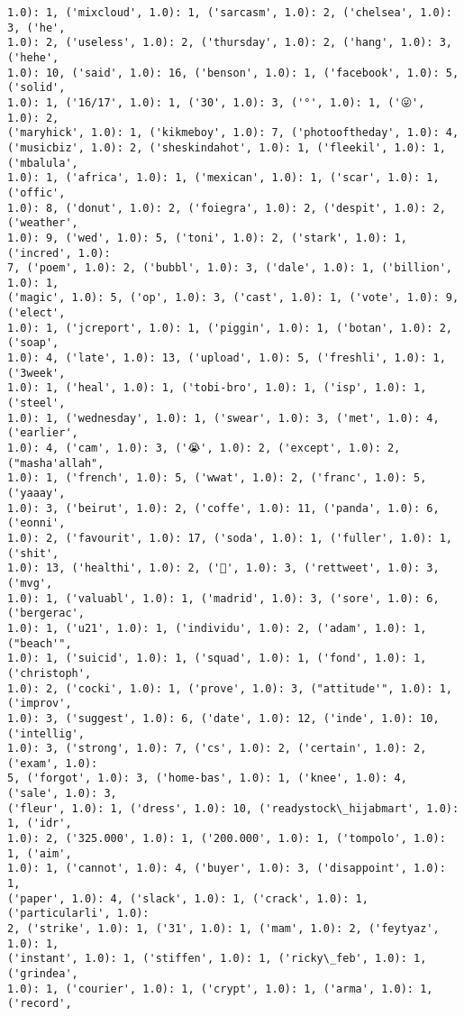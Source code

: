 \documentclass[11pt]{article}
\begin{document}
\begin{Verbatim}[commandchars=\\\{\}]
1.0): 1, ('mixcloud', 1.0): 1, ('sarcasm', 1.0): 2, ('chelsea', 1.0): 3, ('he',
1.0): 2, ('useless', 1.0): 2, ('thursday', 1.0): 2, ('hang', 1.0): 3, ('hehe',
1.0): 10, ('said', 1.0): 16, ('benson', 1.0): 1, ('facebook', 1.0): 5, ('solid',
1.0): 1, ('16/17', 1.0): 1, ('30', 1.0): 3, ('°', 1.0): 1, ('😜', 1.0): 2,
('maryhick', 1.0): 1, ('kikmeboy', 1.0): 7, ('photooftheday', 1.0): 4,
('musicbiz', 1.0): 2, ('sheskindahot', 1.0): 1, ('fleekil', 1.0): 1, ('mbalula',
1.0): 1, ('africa', 1.0): 1, ('mexican', 1.0): 1, ('scar', 1.0): 1, ('offic',
1.0): 8, ('donut', 1.0): 2, ('foiegra', 1.0): 2, ('despit', 1.0): 2, ('weather',
1.0): 9, ('wed', 1.0): 5, ('toni', 1.0): 2, ('stark', 1.0): 1, ('incred', 1.0):
7, ('poem', 1.0): 2, ('bubbl', 1.0): 3, ('dale', 1.0): 1, ('billion', 1.0): 1,
('magic', 1.0): 5, ('op', 1.0): 3, ('cast', 1.0): 1, ('vote', 1.0): 9, ('elect',
1.0): 1, ('jcreport', 1.0): 1, ('piggin', 1.0): 1, ('botan', 1.0): 2, ('soap',
1.0): 4, ('late', 1.0): 13, ('upload', 1.0): 5, ('freshli', 1.0): 1, ('3week',
1.0): 1, ('heal', 1.0): 1, ('tobi-bro', 1.0): 1, ('isp', 1.0): 1, ('steel',
1.0): 1, ('wednesday', 1.0): 1, ('swear', 1.0): 3, ('met', 1.0): 4, ('earlier',
1.0): 4, ('cam', 1.0): 3, ('😭', 1.0): 2, ('except', 1.0): 2, ("masha'allah",
1.0): 1, ('french', 1.0): 5, ('wwat', 1.0): 2, ('franc', 1.0): 5, ('yaaay',
1.0): 3, ('beirut', 1.0): 2, ('coffe', 1.0): 11, ('panda', 1.0): 6, ('eonni',
1.0): 2, ('favourit', 1.0): 17, ('soda', 1.0): 1, ('fuller', 1.0): 1, ('shit',
1.0): 13, ('healthi', 1.0): 2, ('💓', 1.0): 3, ('rettweet', 1.0): 3, ('mvg',
1.0): 1, ('valuabl', 1.0): 1, ('madrid', 1.0): 3, ('sore', 1.0): 6, ('bergerac',
1.0): 1, ('u21', 1.0): 1, ('individu', 1.0): 2, ('adam', 1.0): 1, ("beach'",
1.0): 1, ('suicid', 1.0): 1, ('squad', 1.0): 1, ('fond', 1.0): 1, ('christoph',
1.0): 2, ('cocki', 1.0): 1, ('prove', 1.0): 3, ("attitude'", 1.0): 1, ('improv',
1.0): 3, ('suggest', 1.0): 6, ('date', 1.0): 12, ('inde', 1.0): 10, ('intellig',
1.0): 3, ('strong', 1.0): 7, ('cs', 1.0): 2, ('certain', 1.0): 2, ('exam', 1.0):
5, ('forgot', 1.0): 3, ('home-bas', 1.0): 1, ('knee', 1.0): 4, ('sale', 1.0): 3,
('fleur', 1.0): 1, ('dress', 1.0): 10, ('readystock\_hijabmart', 1.0): 1, ('idr',
1.0): 2, ('325.000', 1.0): 1, ('200.000', 1.0): 1, ('tompolo', 1.0): 1, ('aim',
1.0): 1, ('cannot', 1.0): 4, ('buyer', 1.0): 3, ('disappoint', 1.0): 1,
('paper', 1.0): 4, ('slack', 1.0): 1, ('crack', 1.0): 1, ('particularli', 1.0):
2, ('strike', 1.0): 1, ('31', 1.0): 1, ('mam', 1.0): 2, ('feytyaz', 1.0): 1,
('instant', 1.0): 1, ('stiffen', 1.0): 1, ('ricky\_feb', 1.0): 1, ('grindea',
1.0): 1, ('courier', 1.0): 1, ('crypt', 1.0): 1, ('arma', 1.0): 1, ('record',

\end{Verbatim}
\end{document}
